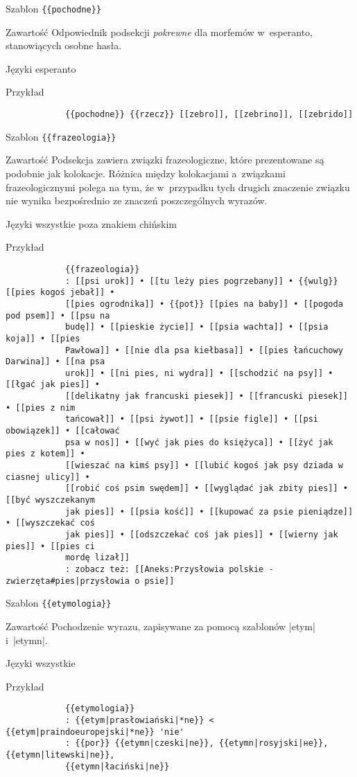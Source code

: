 \documentclass{pracamgr}
\begin{document}
\spacer
\begin{opis}
	\item[Szablon] \verb|{{pochodne}}|
	\item[Zawartość] Odpowiednik podsekcji \emph{pokrewne} dla morfemów w~esperanto, stanowiących osobne hasła.
	\item[Języki] esperanto
	\item[Przykład]
		\begin{verbatim}
			{{pochodne}} {{rzecz}} [[zebro]], [[zebrino]], [[zebrido]]
		\end{verbatim}
\end{opis}
\spacer
\begin{opis}
	\item[Szablon] \verb|{{frazeologia}}|
	\item[Zawartość] Podsekcja zawiera związki frazeologiczne, które prezentowane są podobnie jak kolokacje. Różnica między kolokacjami a~związkami frazeologicznymi polega na tym, że w~przypadku tych drugich znaczenie związku nie wynika bezpośrednio ze znaczeń poszczególnych wyrazów.
	\item[Języki] wszystkie poza znakiem chińskim
	\item[Przykład]
		\begin{verbatim}
			{{frazeologia}}
			: [[psi urok]] • [[tu leży pies pogrzebany]] • {{wulg}} [[pies kogoś jebał]] •
			[[pies ogrodnika]] • {{pot}} [[pies na baby]] • [[pogoda pod psem]] • [[psu na
			budę]] • [[pieskie życie]] • [[psia wachta]] • [[psia koja]] • [[pies
			Pawłowa]] • [[nie dla psa kiełbasa]] • [[pies łańcuchowy Darwina]] • [[na psa
			urok]] • [[ni pies, ni wydra]] • [[schodzić na psy]] • [[łgać jak pies]] •
			[[delikatny jak francuski piesek]] • [[francuski piesek]] • [[pies z nim
			tańcował]] • [[psi żywot]] • [[psie figle]] • [[psi obowiązek]] • [[całować
			psa w nos]] • [[wyć jak pies do księżyca]] • [[żyć jak pies z kotem]] •
			[[wieszać na kimś psy]] • [[lubić kogoś jak psy dziada w ciasnej ulicy]] •
			[[robić coś psim swędem]] • [[wyglądać jak zbity pies]] • [[być wyszczekanym
			jak pies]] • [[psia kość]] • [[kupować za psie pieniądze]] • [[wyszczekać coś
			jak pies]] • [[odszczekać coś jak pies]] • [[wierny jak pies]] • [[pies ci
			mordę lizał]]
			: zobacz też: [[Aneks:Przysłowia polskie - zwierzęta#pies|przysłowia o psie]]
		\end{verbatim}
\end{opis}
\spacer
\begin{opis}
	\item[Szablon] \verb|{{etymologia}}|
	\item[Zawartość] Pochodzenie wyrazu, zapisywane za pomocą szablonów \kod|{{etym}}| i~\kod|{{etymn}}|.
	\item[Języki] wszystkie
	\item[Przykład]
		\begin{verbatim}
			{{etymologia}}
			: {{etym|prasłowiański|*ne}} < {{etym|praindoeuropejski|*ne}} 'nie'
			: {{por}} {{etymn|czeski|ne}}, {{etymn|rosyjski|не}}, {{etymn|litewski|ne}},
			{{etymn|łaciński|ne}}
		\end{verbatim}
\end{opis}
\end{document}
